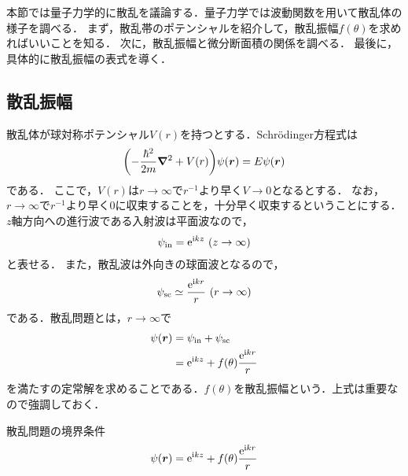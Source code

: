 \documentclass{report}
\begin{document}
  本節では量子力学的に散乱を議論する．量子力学では波動関数を用いて散乱体の様子を調べる．
  まず，散乱帯のポテンシャルを紹介して，散乱振幅$f(\theta)$を求めればいいことを知る．
  次に，散乱振幅と微分断面積の関係を調べる．
  最後に，具体的に散乱振幅の表式を導く．
  \subsection{散乱振幅}
    散乱体が球対称ポテンシャル$V(r)$を持つとする．Schrödinger方程式は
    \begin{align}
      \qty(-\frac{\hbar^2}{2m}\grad^2 + V(r))\psi(\bm{r}) = E \psi(\bm{r})\label{se-scattering}
    \end{align}
    である．
    ここで，$V(r)$は$r \to \infty$で$r^{-1}$より早く$V \to 0$となるとする．
    なお，$r \to \infty$で$r^{-1}$より早く$0$に収束することを，十分早く収束するということにする．
    $z$軸方向への進行波である入射波は平面波なので，
    \begin{align}
      \psi_{\mathrm{in}} = \mathrm{e}^{\mathrm{i} k z}\ (z \to \infty)
    \end{align}
    と表せる．
    また，散乱波は外向きの球面波となるので，
    \begin{align}
      \psi_{\mathrm{sc}} \simeq \frac{\mathrm{e}^{\mathrm{i} kr}}{r}\ (r \to \infty)
    \end{align}
    である．散乱問題とは，$r \to \infty$で
    \begin{align}
      \psi(\bm{r}) &= \psi_{\mathrm{in}} + \psi_{\mathrm{sc}} \\ 
      &= \mathrm{e}^{\mathrm{i} kz} + f(\theta) \frac{\mathrm{e}^{\mathrm{i} kr}}{r}
    \end{align}
    を満たすの定常解を求めることである．$f(\theta)$を散乱振幅という．上式は重要なので強調しておく．
    \begin{itembox}[l]{散乱問題の境界条件}
      \begin{align}
        \psi(\bm{r}) = \mathrm{e}^{\mathrm{i} kz} + f(\theta) \frac{\mathrm{e}^{\mathrm{i} kr}}{r}\label{psi-r-in-sc-k}
      \end{align}
    \end{itembox}
\end{document}
